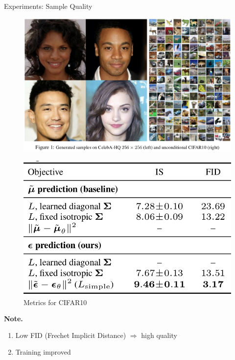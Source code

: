 \documentclass[aspectratio=169, 9pt]{beamer}
\theoremstyle{definition}
\begin{document}
\begin{frame}{Experiments: Sample Quality}
  \begin{minipage}[t]{0.6\textwidth}
    \begin{figure}[h!]
      \centering
      \includegraphics[width=\textwidth]{./pic/ho_celeb.png}
    \end{figure}
  \end{minipage}\hfill%
  \begin{minipage}[t]{0.35\textwidth}
    \begin{figure}[h]
      \centering
      \includegraphics[width=\textwidth]{./pic/ho_result.png}
      \caption{Metrics for CIFAR10}
    \end{figure}
    \textbf{Note.}
    \begin{enumerate}
      \item Low FID (Frechet Implicit Distance) $\Rightarrow$ high quality 
      \item Training improved
    \end{enumerate}
  \end{minipage}

\end{frame}
\end{document}
